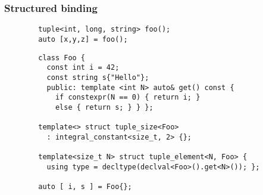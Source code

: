 \documentclass[C++.tex]{subfiles}
\begin{document}
\begin{frame}[fragile]
	\frametitle{Structured binding}
	\begin{verbatim}
		tuple<int, long, string> foo();
		auto [x,y,z] = foo();
	\end{verbatim}

	\begin{verbatim}
		class Foo {
		  const int i = 42;
		  const string s{"Hello"};
		  public: template <int N> auto& get() const {
		    if constexpr(N == 0) { return i; }
		    else { return s; } } };

		template<> struct tuple_size<Foo>
		  : integral_constant<size_t, 2> {};

		template<size_t N> struct tuple_element<N, Foo> {
		  using type = decltype(declval<Foo>().get<N>()); };

		auto [ i, s ] = Foo{};
	\end{verbatim}




\end{frame}
\end{document}
